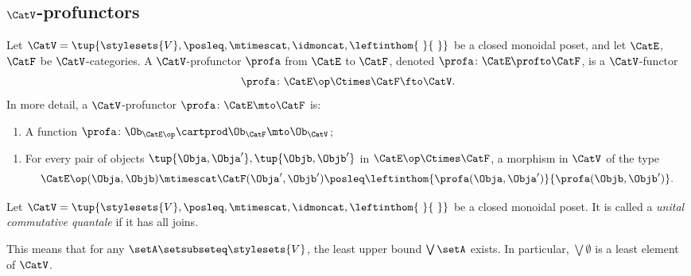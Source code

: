 \subsection{$\CatV$-profunctors}

\begin{ctdefinition}
    \label{def:profunctor-monoidal-poset-enriched}
    Let $\CatV = \tup{\stylesets{V}, \posleq, \mtimescat, \idmoncat, \leftinthom{\ }{\ }}$ be a closed monoidal poset, and let $\CatE$, $\CatF$ be $\CatV$-categories.
    A $\CatV$-profunctor $\profa$ from $\CatE$ to $\CatF$, denoted $\profa \colon \CatE \profto \CatF$, is a $\CatV$-functor
    \begin{equation}
        \profa \colon \CatE\op \Ctimes \CatF \fto \CatV.
    \end{equation}
    In more detail, a $\CatV$-profunctor $\profa \colon \CatE \mto \CatF$ is:

    \constit

    \begin{enumerate}
        \item A function $\profa \colon \Ob_{\CatE\op} \cartprod \Ob_{\CatF} \mto \Ob_\CatV$;
    \end{enumerate}

    \condit

    \begin{enumerate}
        \item For every pair of objects $\tup{\Obja, \Obja'}, \tup{\Objb, \Objb'}$ in $\CatE\op \Ctimes \CatF$, a morphism in $\CatV$ of the type
              \begin{equation}
                  \CatE\op(\Obja, \Objb) \mtimescat \CatF(\Obja', \Objb') \posleq \leftinthom{\profa(\Obja, \Obja')}{\profa(\Objb, \Objb')}.
              \end{equation}
    \end{enumerate}
\end{ctdefinition}

\begin{ctdefinition}
    \label{def:unital-commutative-quantale}
    Let $\CatV = \tup{\stylesets{V}, \posleq, \mtimescat, \idmoncat, \leftinthom{\ }{\ }}$ be a closed monoidal poset.
    It is called a \emph{unital commutative quantale} if it has all joins.

    This means that for any $\setA \setsubseteq \stylesets{V}$, the least upper bound $\bigvee\setA$ exists.
    In particular, $\bigvee \emptyset$ is a least element of $\CatV$.
\end{ctdefinition}

